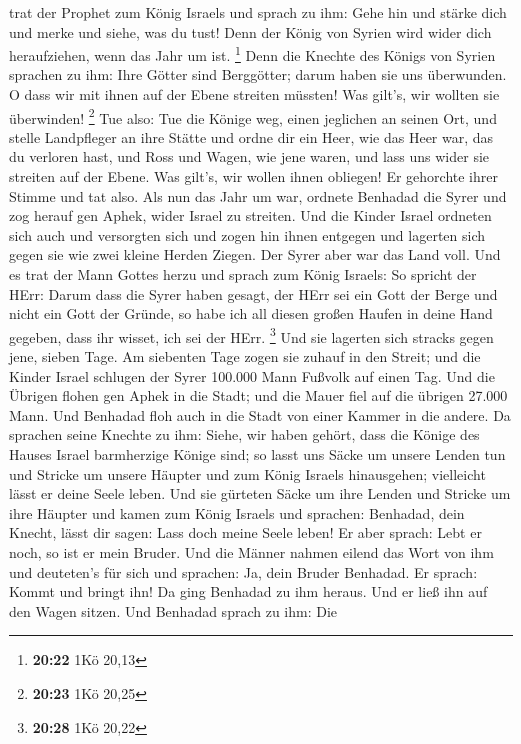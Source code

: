 trat der Prophet zum König Israels und sprach zu ihm: Gehe hin und
stärke dich und merke und siehe, was du tust! Denn der König von Syrien
wird wider dich heraufziehen, wenn das Jahr um ist. \footnote{\textbf{20:22}
  1Kö 20,13}  Denn die Knechte des Königs von Syrien
sprachen zu ihm: Ihre Götter sind Berggötter; darum haben sie uns
überwunden. O dass wir mit ihnen auf der Ebene streiten müssten! Was
gilt's, wir wollten sie überwinden! \footnote{\textbf{20:23} 1Kö 20,25}
 Tue also: Tue die Könige weg, einen jeglichen an seinen
Ort, und stelle Landpfleger an ihre Stätte  und ordne dir
ein Heer, wie das Heer war, das du verloren hast, und Ross und Wagen,
wie jene waren, und lass uns wider sie streiten auf der Ebene. Was
gilt's, wir wollen ihnen obliegen! Er gehorchte ihrer Stimme und tat
also.  Als nun das Jahr um war, ordnete Benhadad die Syrer
und zog herauf gen Aphek, wider Israel zu streiten.  Und
die Kinder Israel ordneten sich auch und versorgten sich und zogen hin
ihnen entgegen und lagerten sich gegen sie wie zwei kleine Herden
Ziegen. Der Syrer aber war das Land voll.  Und es trat der
Mann Gottes herzu und sprach zum König Israels: So spricht der HErr:
Darum dass die Syrer haben gesagt, der HErr sei ein Gott der Berge und
nicht ein Gott der Gründe, so habe ich all diesen großen Haufen in deine
Hand gegeben, dass ihr wisset, ich sei der HErr. \footnote{\textbf{20:28}
  1Kö 20,22}  Und sie lagerten sich stracks gegen jene,
sieben Tage. Am siebenten Tage zogen sie zuhauf in den Streit; und die
Kinder Israel schlugen der Syrer 100.000 Mann Fußvolk auf einen Tag.
 Und die Übrigen flohen gen Aphek in die Stadt; und die
Mauer fiel auf die übrigen 27.000 Mann. Und Benhadad floh auch in die
Stadt von einer Kammer in die andere.  Da sprachen seine
Knechte zu ihm: Siehe, wir haben gehört, dass die Könige des Hauses
Israel barmherzige Könige sind; so lasst uns Säcke um unsere Lenden tun
und Stricke um unsere Häupter und zum König Israels hinausgehen;
vielleicht lässt er deine Seele leben.  Und sie gürteten
Säcke um ihre Lenden und Stricke um ihre Häupter und kamen zum König
Israels und sprachen: Benhadad, dein Knecht, lässt dir sagen: Lass doch
meine Seele leben! Er aber sprach: Lebt er noch, so ist er mein Bruder.
 Und die Männer nahmen eilend das Wort von ihm und
deuteten's für sich und sprachen: Ja, dein Bruder Benhadad. Er sprach:
Kommt und bringt ihn! Da ging Benhadad zu ihm heraus. Und er ließ ihn
auf den Wagen sitzen.  Und Benhadad sprach zu ihm: Die
